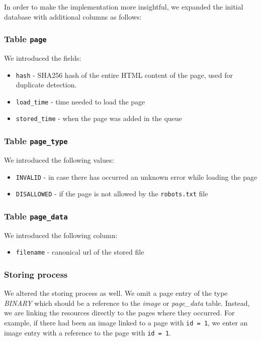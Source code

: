 \documentclass{article}
\begin{document}
In order to make the implementation more insightful, we expanded the initial database with additional columns as follows:
\subsubsection{Table \texttt{page}}
We introduced the fields:
\begin{itemize}
    \item \texttt{hash} - SHA256 hash of the entire HTML content of the page, used for duplicate detection.
    \item \texttt{load\_time} - time needed to load the page
    \item \texttt{stored\_time} - when the page was added in the queue
\end{itemize}
\subsubsection{Table \texttt{page\_type}}
We introduced the following values:
\begin{itemize}
    \item \texttt{INVALID} - in case there has occurred an unknown error while loading the page
    \item \texttt{DISALLOWED} - if the page is not allowed by the \texttt{robots.txt} file
\end{itemize}

\subsubsection{Table \texttt{page\_data}}
We introduced the following column:
\begin{itemize}
    \item \texttt{filename} - canonical url of the stored file
\end{itemize}

\subsubsection{Storing process}

We altered the storing process as well. We omit a page entry of the type \textit{BINARY} which should be a reference to the \textit{image} or \textit{page\_data} table. Instead, we are linking the resources directly to the pages where they occurred. For example, if there had been an image linked to a page with \texttt{id = 1}, we enter an image entry with a reference to the page with \texttt{id = 1}.
\end{document}

